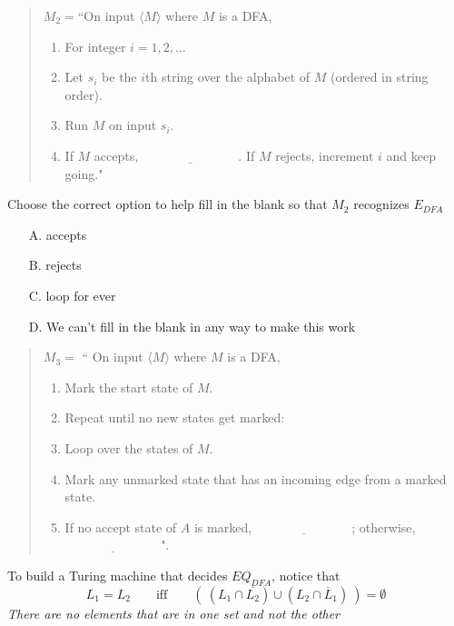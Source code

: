 \documentclass[12pt, oneside]{article}
\begin{document}
  \begin{quote}
  $M_2 =  $``On  input  $\langle M\rangle$ where $M$ is a  DFA,
  \begin{enumerate}
  \item For integer  $i = 1, 2, \ldots$
  \item \qquad Let  $s_i$ be the  $i$th string over  the alphabet of  $M$ (ordered in  string order).
  \item \qquad Run $M$ on  input  $s_i$.
  \item \qquad If $M$  accepts,  $\underline{\phantom{FILL  IN BLANK}}$.  If $M$  rejects, increment $i$ and keep going."
  \end{enumerate}
  \end{quote}
  

Choose the correct option to help fill in the blank so that $M_2$ recognizes $E_{DFA}$
\begin{itemize}
\item[A.] accepts
\item[B.] rejects
\item[C.] loop for ever
\item[D.] We can't fill in the blank in any way to make this work
\end{itemize}

\newpage
  

  
  \begin{quote}
  $M_3 =  $ `` On  input $\langle M \rangle$ where $M$ is  a  DFA,
  \begin{enumerate}
  \item Mark the start  state  of $M$.
  \item Repeat until no  new states get marked:
  \item \qquad Loop over the states of $M$. 
  \item \qquad Mark any unmarked  state  that  has an incoming  edge  from a marked state.
  \item If  no  accept state of $A$ is  marked, $\underline{\phantom{FILL  IN BLANK}}$;  otherwise, 
  $\underline{\phantom{FILL  IN BLANK}}$".
  \end{enumerate}
  \end{quote}
  
  
  
To build a Turing machine that decides $EQ_{DFA}$, notice that 
\[
L_1 = L_2 \qquad\textrm{iff}\qquad (~(L_1 \cap \overline{L_2}) \cup (L_2 \cap \overline L_1)~) = \emptyset  
\]
{\it There are no elements that are in one set and not the other}
\end{document}
